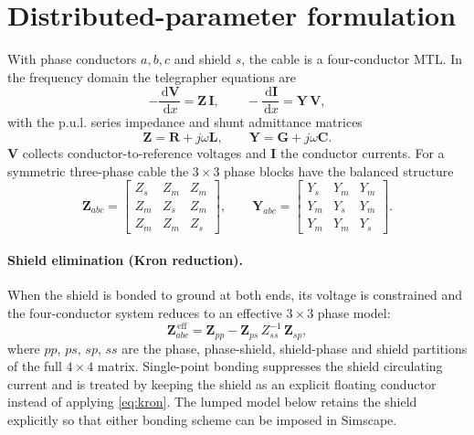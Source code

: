 \documentclass[11pt,a4paper]{article}
\newcommand{\ud}{\,\mathrm{d}}
\newcommand{\Zmat}{\bm{Z}}
\newcommand{\Ymat}{\bm{Y}}
\newcommand{\Rmat}{\bm{R}}
\newcommand{\Lmat}{\bm{L}}
\newcommand{\Cmat}{\bm{C}}
\newcommand{\Gmat}{\bm{G}}
\newcommand{\Vvec}{\bm{V}}
\newcommand{\Ivec}{\bm{I}}
\begin{document}
\section{Distributed-parameter formulation}
With phase conductors $a,b,c$ and shield $s$, the cable is a four-conductor MTL.
In the frequency domain the telegrapher equations are
\begin{equation}
-\frac{\ud \Vvec}{\ud x}=\Zmat\,\Ivec,
\qquad
-\frac{\ud \Ivec}{\ud x}=\Ymat\,\Vvec,
\label{eq:telegraph}
\end{equation}
with the p.u.l. series impedance and shunt admittance matrices
\begin{equation}
\Zmat=\Rmat+j\omega\Lmat,
\qquad
\Ymat=\Gmat+j\omega\Cmat .
\label{eq:ZY}
\end{equation}
$\Vvec$ collects conductor-to-reference voltages and $\Ivec$ the conductor
currents. For a symmetric three-phase cable the $3\times3$ phase blocks have the
balanced structure
\begin{equation}
\Zmat_{abc}=
\begin{bmatrix}
Z_s & Z_m & Z_m\\
Z_m & Z_s & Z_m\\
Z_m & Z_m & Z_s
\end{bmatrix},
\qquad
\Ymat_{abc}=
\begin{bmatrix}
Y_s & Y_m & Y_m\\
Y_m & Y_s & Y_m\\
Y_m & Y_m & Y_s
\end{bmatrix}.
\label{eq:balanced}
\end{equation}

\paragraph{Shield elimination (Kron reduction).}
When the shield is bonded to ground at both ends, its voltage is constrained and
the four-conductor system reduces to an effective $3\times3$ phase model:
\begin{equation}
\Zmat_{abc}^{\,\mathrm{eff}}
=\Zmat_{pp}-\Zmat_{ps}\,Z_{ss}^{-1}\,\Zmat_{sp},
\label{eq:kron}
\end{equation}
where $pp$, $ps$, $sp$, $ss$ are the phase, phase-shield, shield-phase and shield
partitions of the full $4\times4$ matrix. Single-point bonding suppresses the
shield circulating current and is treated by keeping the shield as an explicit
floating conductor instead of applying \eqref{eq:kron}. The lumped model below
retains the shield explicitly so that either bonding scheme can be imposed in
Simscape.
\end{document}
